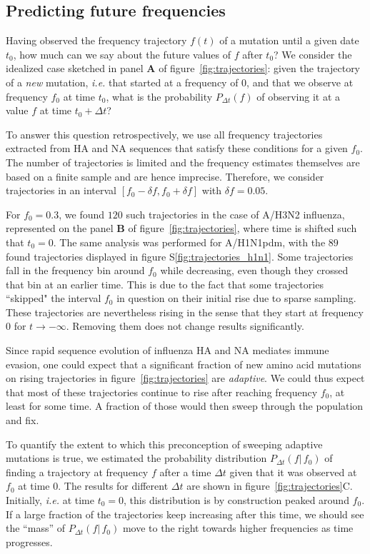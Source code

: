 \documentclass[reprint,amsmath,amssymb,superscriptaddress,showpacs,rmp]{revtex4-1}
\newcommand{\sref}[1]{S\ref{#1}}
\begin{document}
\subsection*{Predicting future frequencies}
Having observed the frequency trajectory $f(t)$ of a mutation until a given date $t_0$, how much can we say about the future values of $f$ after $t_0$? 
We consider the idealized case sketched in panel \textbf{A} of figure~\ref{fig:trajectories}: given the trajectory of a \emph{new} mutation, \emph{i.e.} that started at a frequency of 0, and that we observe at frequency $f_0$ at time $t_0$, what is the probability $P_{\Delta t}(f)$ of observing it at a value $f$ at time $t_0 + \Delta t$? 

To answer this question retrospectively, we use all frequency trajectories extracted from HA and NA sequences that satisfy these conditions for a given $f_0$.  The number of trajectories is limited and the frequency estimates themselves are based on a finite sample and are hence imprecise. 
Therefore, we consider trajectories in an interval $[f_0-\delta f, f_0+\delta f]$ with $\delta f = 0.05$. 

For $f_0=0.3$, we found $120$ such trajectories in the case of A/H3N2 influenza, represented on the panel \textbf{B} of figure~\ref{fig:trajectories}, where time is shifted such that $t_0 = 0$. The same analysis was performed for A/H1N1pdm, with the $89$ found trajectories displayed in figure \sref{fig:trajectories_h1n1}.
Some trajectories fall in the frequency bin around $f_0$ while decreasing, even though they crossed that bin at an earlier time. 
This is due to the fact that some trajectories ``skipped" the interval $f_0$ in question on their initial rise due to sparse sampling. 
These trajectories are nevertheless rising in the sense that they start at frequency 0 for $t\rightarrow -\infty$. 
Removing them does not change results significantly. 

Since rapid sequence evolution of influenza HA and NA mediates immune evasion, one could expect that a significant fraction of new amino acid mutations on rising trajectories in figure~\ref{fig:trajectories} are \emph{adaptive}. 
We could thus expect that most of these trajectories continue to rise after reaching frequency $f_0$, at least for some time. 
A fraction of those would then sweep through the population and fix. 

To quantify the extent to which this preconception of sweeping adaptive mutations is true, we estimated the probability distribution $P_{\Delta t}(f\vert\,f_0)$ of finding a trajectory at frequency $f$ after a time $\Delta t$ given that it was observed at $f_0$ at time $0$. 
The results for different $\Delta t$ are shown in figure~\ref{fig:trajectories}C. 
Initially, \emph{i.e.} at time $t_0=0$, this distribution is by construction peaked around $f_0$. 
If a large fraction of the trajectories keep increasing after  this time, we should see the ``mass'' of $P_{\Delta t}(f\vert\,f_0)$ move to the right towards higher frequencies as time progresses.
\end{document}
